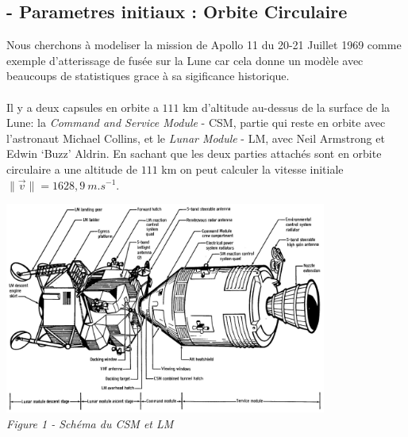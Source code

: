 \documentclass[a4paper, 12pt]{scrartcl}
\begin{document}
\subsection{- Parametres initiaux : Orbite Circulaire}
Nous cherchons à modeliser la mission de Apollo 11 du 20-21 Juillet 1969 comme exemple d'atterissage
de fusée sur la Lune car cela donne un modèle avec beaucoups de statistiques grace à sa sigificance 
historique. 
\\
\\
\indent
Il y a deux capsules en orbite a $111$ km d'altitude au-dessus de la surface de la Lune: la \emph{Command and Service Module} - CSM,
partie qui reste en orbite avec l'astronaut Michael Collins, et le \emph{Lunar Module} - LM, avec Neil Armstrong et Edwin `Buzz' Aldrin.
En sachant que les deux parties attachés sont en orbite circulaire a une altitude de $111$ km on peut calculer
la vitesse initiale $\| \overrightarrow{v} \| = 1628,9\ \si{m.s^{-1}}$. 

\begin{center}
\includegraphics[width=300pt]{CSM+LM_Schema}
\\
\vspace{5mm}
\emph{Figure 1 - Schéma du CSM et LM}
\end{center}
\end{document}
